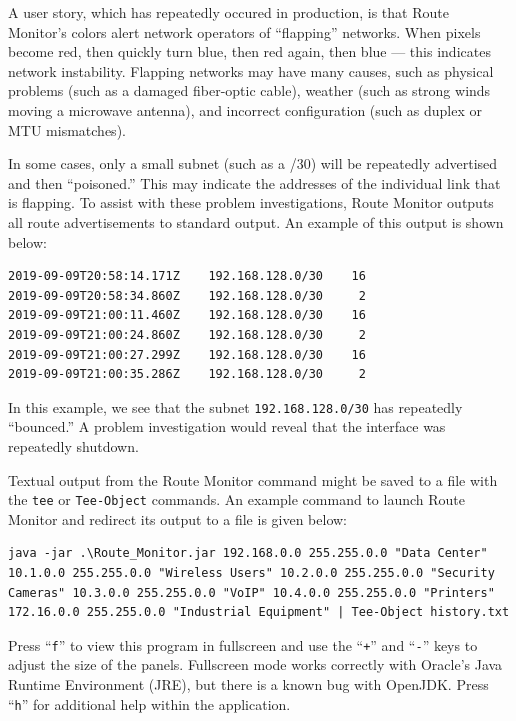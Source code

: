 \documentclass[12pt]{article}
\begin{document}
A user story, which has repeatedly occured in production, is that Route Monitor's colors alert network operators of ``flapping'' networks.
When pixels become red, then quickly turn blue, then red again, then blue --- this indicates network instability.
Flapping networks may have many causes, such as physical problems (such as a damaged fiber-optic cable), weather (such as strong winds moving a microwave antenna), and incorrect configuration (such as duplex or MTU mismatches).

In some cases, only a small subnet (such as a /30) will be repeatedly advertised and then ``poisoned.''
This may indicate the addresses of the individual link that is flapping.
To assist with these problem investigations, Route Monitor outputs all route advertisements to standard output.
An example of this output is shown below:

\begin{lstlisting}
2019-09-09T20:58:14.171Z	192.168.128.0/30   	16
2019-09-09T20:58:34.860Z	192.168.128.0/30   	 2
2019-09-09T21:00:11.460Z	192.168.128.0/30   	16
2019-09-09T21:00:24.860Z	192.168.128.0/30   	 2
2019-09-09T21:00:27.299Z	192.168.128.0/30   	16
2019-09-09T21:00:35.286Z	192.168.128.0/30   	 2
\end{lstlisting}

In this example, we see that the subnet \texttt{192.168.128.0/30} has repeatedly ``bounced.''
A problem investigation would reveal that the interface was repeatedly shutdown.

Textual output from the Route Monitor command might be saved to a file with the \texttt{tee} or \texttt{Tee-Object} commands.
An example command to launch Route Monitor and redirect its output to a file is given below:

\begin{lstlisting}
java -jar .\Route_Monitor.jar 192.168.0.0 255.255.0.0 "Data Center" 10.1.0.0 255.255.0.0 "Wireless Users" 10.2.0.0 255.255.0.0 "Security Cameras" 10.3.0.0 255.255.0.0 "VoIP" 10.4.0.0 255.255.0.0 "Printers" 172.16.0.0 255.255.0.0 "Industrial Equipment" | Tee-Object history.txt
\end{lstlisting}

Press ``\texttt{f}'' to view this program in fullscreen and use the ``\texttt{+}'' and ``\texttt{-}'' keys to adjust the size of the panels.
Fullscreen mode works correctly with Oracle's Java Runtime Environment (JRE), but there is a known bug with OpenJDK. Press ``\texttt{h}'' for additional help within the application.
\end{document}
